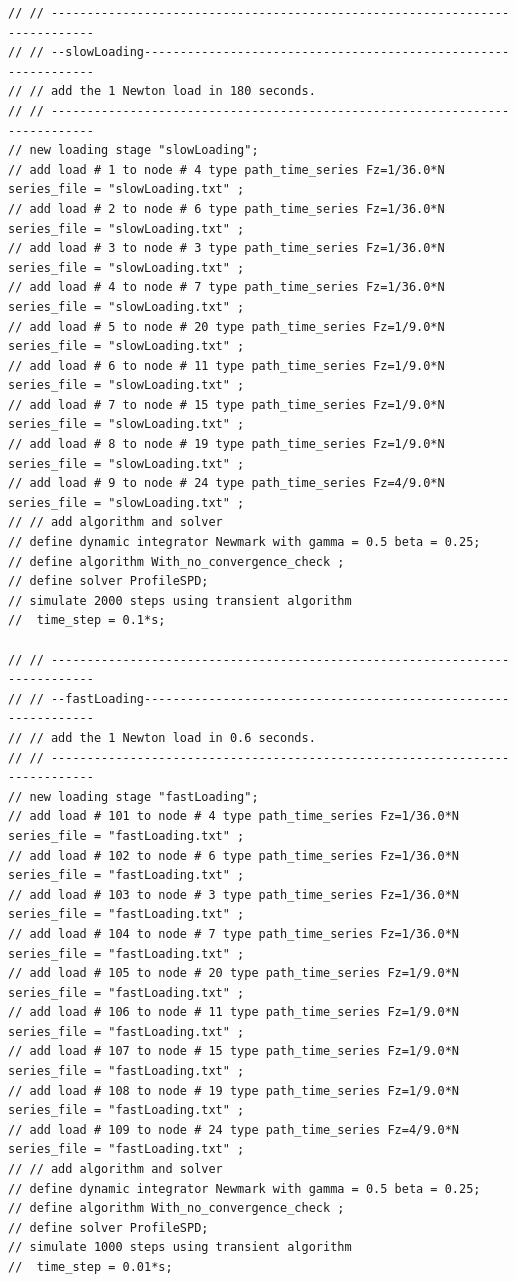 \begin{lstlisting}
// // ----------------------------------------------------------------------------
// // --slowLoading---------------------------------------------------------------
// // add the 1 Newton load in 180 seconds.
// // ----------------------------------------------------------------------------
// new loading stage "slowLoading";
// add load # 1 to node # 4 type path_time_series Fz=1/36.0*N series_file = "slowLoading.txt" ; 
// add load # 2 to node # 6 type path_time_series Fz=1/36.0*N series_file = "slowLoading.txt" ; 
// add load # 3 to node # 3 type path_time_series Fz=1/36.0*N series_file = "slowLoading.txt" ; 
// add load # 4 to node # 7 type path_time_series Fz=1/36.0*N series_file = "slowLoading.txt" ; 
// add load # 5 to node # 20 type path_time_series Fz=1/9.0*N series_file = "slowLoading.txt" ; 
// add load # 6 to node # 11 type path_time_series Fz=1/9.0*N series_file = "slowLoading.txt" ; 
// add load # 7 to node # 15 type path_time_series Fz=1/9.0*N series_file = "slowLoading.txt" ; 
// add load # 8 to node # 19 type path_time_series Fz=1/9.0*N series_file = "slowLoading.txt" ; 
// add load # 9 to node # 24 type path_time_series Fz=4/9.0*N series_file = "slowLoading.txt" ; 
// // add algorithm and solver
// define dynamic integrator Newmark with gamma = 0.5 beta = 0.25;
// define algorithm With_no_convergence_check ;
// define solver ProfileSPD;
// simulate 2000 steps using transient algorithm 
//  time_step = 0.1*s;

// // ----------------------------------------------------------------------------
// // --fastLoading---------------------------------------------------------------
// // add the 1 Newton load in 0.6 seconds.
// // ----------------------------------------------------------------------------
// new loading stage "fastLoading";
// add load # 101 to node # 4 type path_time_series Fz=1/36.0*N series_file = "fastLoading.txt" ; 
// add load # 102 to node # 6 type path_time_series Fz=1/36.0*N series_file = "fastLoading.txt" ; 
// add load # 103 to node # 3 type path_time_series Fz=1/36.0*N series_file = "fastLoading.txt" ; 
// add load # 104 to node # 7 type path_time_series Fz=1/36.0*N series_file = "fastLoading.txt" ; 
// add load # 105 to node # 20 type path_time_series Fz=1/9.0*N series_file = "fastLoading.txt" ; 
// add load # 106 to node # 11 type path_time_series Fz=1/9.0*N series_file = "fastLoading.txt" ; 
// add load # 107 to node # 15 type path_time_series Fz=1/9.0*N series_file = "fastLoading.txt" ; 
// add load # 108 to node # 19 type path_time_series Fz=1/9.0*N series_file = "fastLoading.txt" ; 
// add load # 109 to node # 24 type path_time_series Fz=4/9.0*N series_file = "fastLoading.txt" ; 
// // add algorithm and solver
// define dynamic integrator Newmark with gamma = 0.5 beta = 0.25;
// define algorithm With_no_convergence_check ;
// define solver ProfileSPD;
// simulate 1000 steps using transient algorithm 
//  time_step = 0.01*s;


\end{lstlisting}
